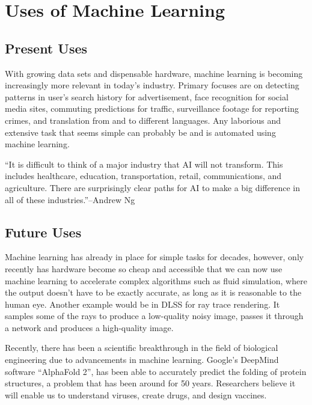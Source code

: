\section{Uses of Machine Learning}

\subsection{Present Uses}

With growing data sets and dispensable hardware, machine learning is becoming increasingly more relevant in today's industry. Primary focuses are on detecting patterns in user's search history for advertisement, face recognition for social media sites, commuting predictions for traffic, surveillance footage for reporting crimes, and translation from and to different languages.
Any laborious and extensive task that seems simple can probably be and is automated using machine learning.

“It is difficult to think of a major industry that AI will not transform. This includes healthcare, education, transportation, retail, communications, and agriculture. There are surprisingly clear paths for AI to make a big difference in all of these industries.”--Andrew Ng

\subsection{Future Uses}

Machine learning has already in place for simple tasks for decades, however, only recently has hardware become so cheap and accessible that we can now use machine learning to accelerate complex algorithms such as fluid simulation, where the output doesn't have to be exactly accurate, as long as it is reasonable to the human eye. Another example would be in DLSS for ray trace rendering. It samples some of the rays to produce a low-quality noisy image, passes it through a network and produces a high-quality image.

Recently, there has been a scientific breakthrough in the field of biological engineering due to advancements in machine learning. Google's DeepMind software “AlphaFold 2”, has been able to accurately predict the folding of protein structures, a problem that has been around for 50 years. Researchers believe it will enable us to understand viruses, create drugs, and design vaccines. 